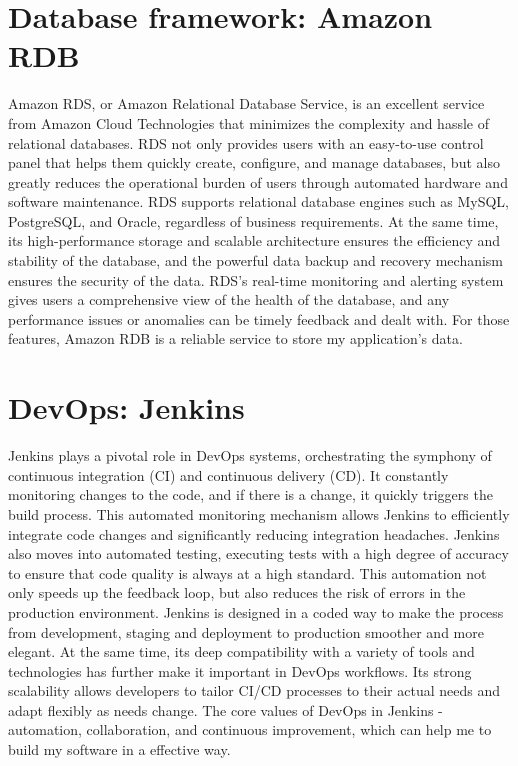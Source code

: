 \documentclass[12pt,two side]{report}
\begin{document}
\section{Database framework: Amazon RDB\cite{awsrds}}
Amazon RDS, or Amazon Relational Database Service, is an excellent service from Amazon Cloud Technologies that minimizes the complexity and hassle of relational databases. RDS not only provides users with an easy-to-use control panel that helps them quickly create, configure, and manage databases, but also greatly reduces the operational burden of users through automated hardware and software maintenance. RDS supports relational database engines such as MySQL, PostgreSQL, and Oracle, regardless of business requirements. At the same time, its high-performance storage and scalable architecture ensures the efficiency and stability of the database, and the powerful data backup and recovery mechanism ensures the security of the data. RDS's real-time monitoring and alerting system gives users a comprehensive view of the health of the database, and any performance issues or anomalies can be timely feedback and dealt with. For those features, Amazon RDB is a reliable service to store my application's data. 
\section{DevOps: Jenkins\cite{jenkins}}
Jenkins plays a pivotal role in DevOps systems, orchestrating the symphony of continuous integration (CI) and continuous delivery (CD). It constantly monitoring changes to the code, and if there is a change, it quickly triggers the build process. This automated monitoring mechanism allows Jenkins to efficiently integrate code changes and significantly reducing integration headaches. Jenkins also moves into automated testing, executing tests with a high degree of accuracy to ensure that code quality is always at a high standard. This automation not only speeds up the feedback loop, but also reduces the risk of errors in the production environment. Jenkins is designed in a coded way to make the process from development, staging and deployment to production smoother and more elegant. At the same time, its deep compatibility with a variety of tools and technologies has further make it important in DevOps workflows. Its strong scalability allows developers to tailor CI/CD processes to their actual needs and adapt flexibly as needs change. The core values of DevOps in Jenkins - automation, collaboration, and continuous improvement, which can help me to build my software in a effective way.
\end{document}
